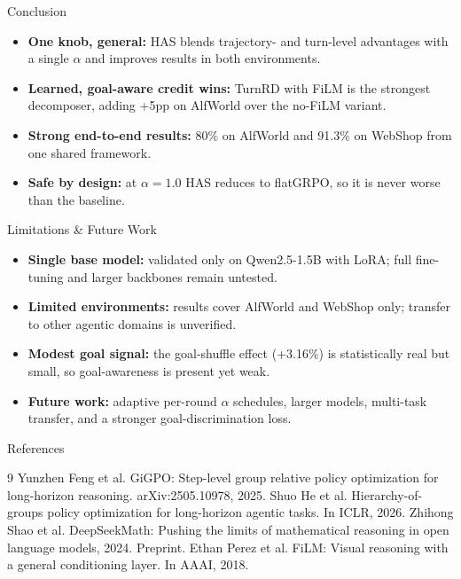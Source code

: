 \documentclass[final]{beamer}
\newlength{\colwidth}
\begin{document}
\begin{frame}[t]
\begin{columns}[t]
\begin{column}{\colwidth}
\begin{block}{Conclusion}
    \begin{itemize}
      \item \textbf{One knob, general:} HAS blends trajectory- and turn-level advantages
            with a single $\alpha$ and improves results in both environments.
      \item \textbf{Learned, goal-aware credit wins:} TurnRD with FiLM is the strongest
            decomposer, adding +5pp on AlfWorld over the no-FiLM variant.
      \item \textbf{Strong end-to-end results:} 80\% on AlfWorld and 91.3\% on WebShop
            from one shared framework.
      \item \textbf{Safe by design:} at $\alpha=1.0$ HAS reduces to flatGRPO, so it is
            never worse than the baseline.
    \end{itemize}

  \end{block}

  \begin{block}{Limitations \& Future Work}

    \begin{itemize}
      \item \textbf{Single base model:} validated only on Qwen2.5-1.5B with LoRA;
            full fine-tuning and larger backbones remain untested.
      \item \textbf{Limited environments:} results cover AlfWorld and WebShop only;
            transfer to other agentic domains is unverified.
      \item \textbf{Modest goal signal:} the goal-shuffle effect (+3.16\%) is statistically
            real but small, so goal-awareness is present yet weak.
      \item \textbf{Future work:} adaptive per-round $\alpha$ schedules, larger models,
            multi-task transfer, and a stronger goal-discrimination loss.
    \end{itemize}

  \end{block}

  \begin{block}{References}

    \footnotesize
    \begin{thebibliography}{9}
      \setlength{\itemsep}{0.3em}
       Yunzhen Feng et al. GiGPO: Step-level group relative policy optimization for long-horizon reasoning. arXiv:2505.10978, 2025.
       Shuo He et al. Hierarchy-of-groups policy optimization for long-horizon agentic tasks. In ICLR, 2026.
       Zhihong Shao et al. DeepSeekMath: Pushing the limits of mathematical reasoning in open language models, 2024. Preprint.
       Ethan Perez et al. FiLM: Visual reasoning with a general conditioning layer. In AAAI, 2018.
    \end{thebibliography}


\end{block}
\end{column}
\end{columns}
\end{frame}
\end{document}
